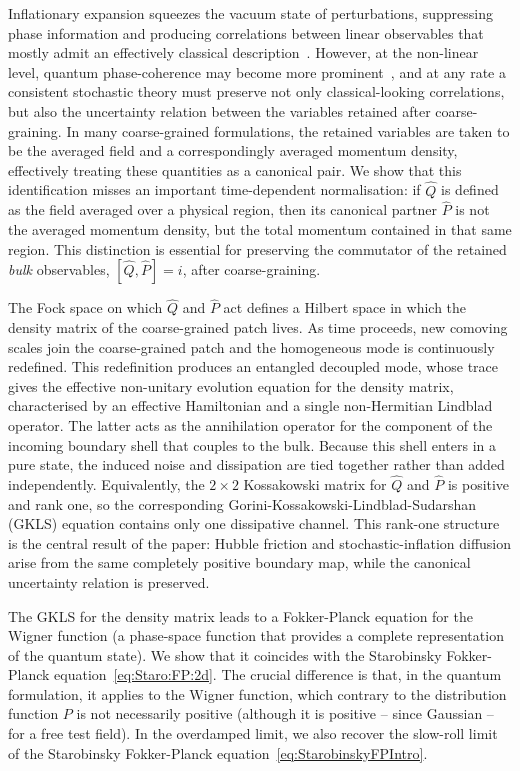 \documentclass{article}
\numberwithin{equation}{section}
\begin{document}
	Inflationary expansion squeezes the vacuum state of perturbations, suppressing phase information and producing correlations between linear observables that mostly admit an effectively classical description~\cite{Martin:2015qta}. However, at the non-linear level, quantum phase-coherence may become more prominent~\cite{Green:2020whw, Launay:2024trh, Ireland:2026txt}, and at any rate a consistent stochastic theory must preserve not only classical-looking correlations, but also the uncertainty relation between the variables retained after coarse-graining. In many coarse-grained formulations, the retained variables are taken to be the averaged field and a correspondingly averaged momentum density, effectively treating these quantities as a canonical pair. We show that this identification misses an important time-dependent normalisation: if \(\hat Q\) is defined as the field averaged over a physical region, then its canonical partner $\hat{P}$ is not the averaged momentum density, but the total momentum contained in that same region. This distinction is essential for preserving the commutator of the retained \textit{bulk} observables, \([\hat Q,\hat P]=i\), after coarse-graining.

	The Fock space on which $\hat{Q}$ and $\hat{P}$ act defines a Hilbert space in which the density matrix of the coarse-grained patch lives. As time proceeds, new comoving scales join the coarse-grained patch and the homogeneous mode is continuously redefined. This redefinition produces an entangled decoupled mode, whose trace gives the effective non-unitary evolution equation for the density matrix, characterised by an effective Hamiltonian and a single non-Hermitian Lindblad operator. The latter acts as the annihilation operator for the component of the incoming boundary shell that couples to the bulk. Because this shell enters in a pure state, the induced noise and dissipation are tied together rather than added independently. Equivalently, the \(2\times2\) Kossakowski matrix for \(\hat Q\) and \(\hat P\) is positive and rank one, so the corresponding Gorini-Kossakowski-Lindblad-Sudarshan (GKLS) equation \cite{gorini1976completely,lindblad1976generators,schlosshauer2007decoherence,wiseman2009quantum,petruccione} contains only one dissipative channel. This rank-one structure is the central result of the paper: Hubble friction and stochastic-inflation diffusion arise from the same completely positive boundary map, while the canonical uncertainty relation is preserved. 

	The GKLS for the density matrix leads to a Fokker-Planck equation for the Wigner function (a phase-space function that provides a complete representation of the quantum state). We show that it coincides with the Starobinsky Fokker-Planck equation~\eqref{eq:Staro:FP:2d}. The crucial difference is that, in the quantum formulation, it applies to the Wigner function, which contrary to the distribution function $P$ is not necessarily positive (although it is positive -- since Gaussian -- for a free test field). In the overdamped limit, we also recover the slow-roll limit of the Starobinsky Fokker-Planck equation~\eqref{eq:StarobinskyFPIntro}. 
\end{document}
